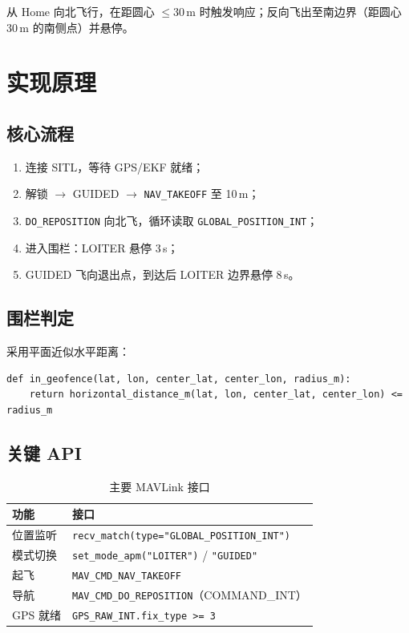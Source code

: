 \documentclass[12pt,a4paper]{article}
\begin{document}
从 Home 向北飞行，在距圆心 $\le 30$\,m 时触发响应；反向飞出至南边界（距圆心 30\,m 的南侧点）并悬停。

\section{实现原理}

\subsection{核心流程}

\begin{enumerate}[leftmargin=2em]
    \item 连接 SITL，等待 GPS/EKF 就绪；
    \item 解锁 $\to$ GUIDED $\to$ \texttt{NAV\_TAKEOFF} 至 10\,m；
    \item \texttt{DO\_REPOSITION} 向北飞，循环读取 \texttt{GLOBAL\_POSITION\_INT}；
    \item 进入围栏：LOITER 悬停 3\,s；
    \item GUIDED 飞向退出点，到达后 LOITER 边界悬停 8\,s。
\end{enumerate}

\subsection{围栏判定}

采用平面近似水平距离：

\begin{lstlisting}
def in_geofence(lat, lon, center_lat, center_lon, radius_m):
    return horizontal_distance_m(lat, lon, center_lat, center_lon) <= radius_m
\end{lstlisting}

\subsection{关键 API}

\begin{table}[htbp]
\centering
\caption{主要 MAVLink 接口}
\begin{tabular}{p{4.5cm}p{8.0cm}}
\toprule
\textbf{功能} & \textbf{接口} \\
\midrule
位置监听 & \texttt{recv\_match(type="GLOBAL\_POSITION\_INT")} \\
模式切换 & \texttt{set\_mode\_apm("LOITER")} / \texttt{"GUIDED"} \\
起飞 & \texttt{MAV\_CMD\_NAV\_TAKEOFF} \\
导航 & \texttt{MAV\_CMD\_DO\_REPOSITION}（COMMAND\_INT） \\
GPS 就绪 & \texttt{GPS\_RAW\_INT.fix\_type >= 3} \\
\bottomrule
\end{tabular}
\end{table}
\end{document}
